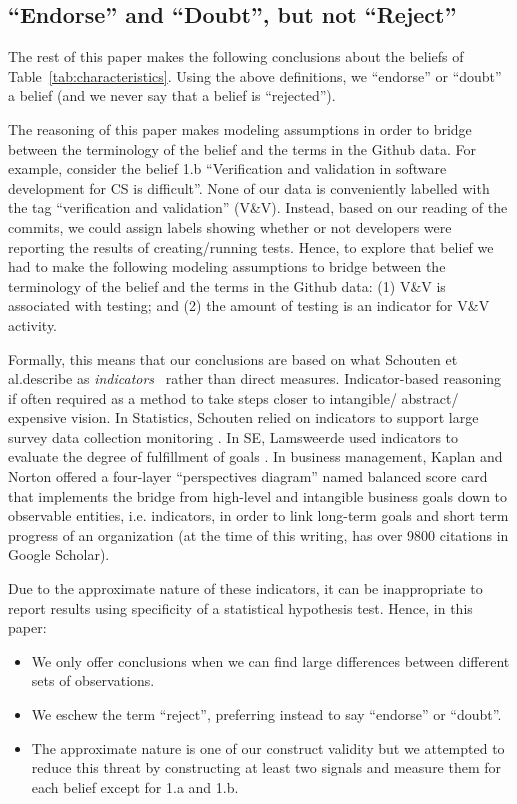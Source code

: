 \documentclass[sigconf,review,anonymous]{acmart}
\newcommand{\bi}{\begin{itemize}}
\newcommand{\ei}{\end{itemize}}
\begin{document}
  



\subsection{``Endorse'' and ``Doubt'', but not ``Reject''}\label{model}

The rest of this paper makes the following conclusions about the beliefs of Table~\ref{tab:characteristics}. Using the above definitions, we ``endorse'' or ``doubt'' a belief (and we never say that a belief is ``rejected''). 

The reasoning of this 
paper makes
modeling assumptions in order to bridge between the terminology of the belief
 and the terms in the Github data.   For example, consider the belief 1.b ``Verification and validation in software development for CS is difficult''.   
 None of our data is conveniently labelled with the tag ``verification and validation'' (V\&V).  Instead, based on our reading of the commits, we could assign labels showing whether or not developers were reporting the results of creating/running tests. Hence, to explore that belief we had to make the following modeling assumptions to bridge between the terminology of the belief and the terms in the Github data: (1) V\&V is associated with testing; and (2) the amount of testing is an indicator for  V\&V activity.


 Formally, this means that our conclusions are based  on what
 Schouten et al.describe as
  {\em indicators}~\cite{schouten2010indicators} rather than direct measures. Indicator-based reasoning
  if often required as a method to take steps closer to intangible/ abstract/ expensive vision. In Statistics, Schouten relied on indicators to support large survey data collection monitoring \cite{schouten2010indicators}. In SE, Lamsweerde used indicators to evaluate the degree of fulfillment of goals \cite{vanLamsweerde2009_requirement}.
  In business 
  management, Kaplan and Norton \cite{kaplan1996using} offered a four-layer ``perspectives diagram'' named balanced score card that implements the bridge from high-level and intangible business goals down
  to observable entities, i.e. indicators, in order to link long-term goals and short term progress of an organization (at the time of this
  writing, has over 9800 citations in Google Scholar).
  
  Due to the approximate
  nature of these indicators, it can
  be inappropriate to report results using
  specificity of a statistical
  hypothesis test. 
 Hence, in this
  paper:
  \bi
  \item We only offer conclusions when
  we can find large differences between different sets of observations.
  \item
  We eschew the term ``reject'',
  preferring instead to say
  ``endorse'' or ``doubt''.
  \item The approximate nature is one of our construct validity but we attempted to reduce this threat by constructing at least two signals and measure them for each belief except for 1.a and 1.b.
\ei
\end{document}
